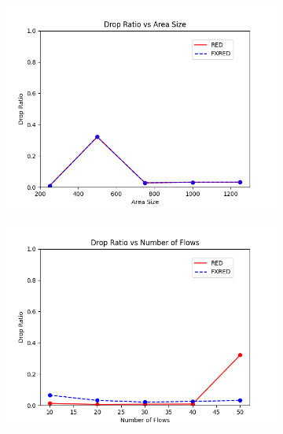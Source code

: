 \documentclass[10pt]{report}
\begin{document}
\begin{figure}
    \centering
    \begin{subfigure}{.5\textwidth}
        \includegraphics[width=1\linewidth]{static/graphs/wireless/Drop Ratio vs Area Size.png}
    \end{subfigure}%
    \begin{subfigure}{.5\textwidth}
        \includegraphics[width=1\linewidth]{static/graphs/wireless/Drop Ratio vs Number of Flows.png}
    \end{subfigure}
    \begin{subfigure}{.5\textwidth}

\end{subfigure}
\end{figure}
\end{document}
